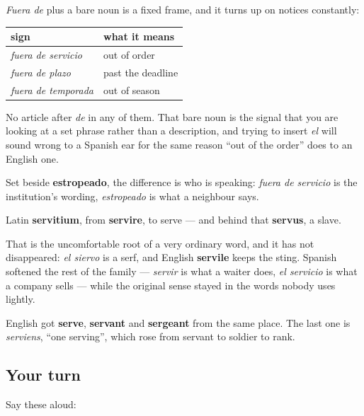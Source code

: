 \begin{grammarlens}[title={Grammar Lens: fuera de servicio, and its cousins}]
\emph{Fuera de} plus a bare noun is a fixed frame, and it turns up on notices constantly:

\noindent
\begin{tabularx}{\linewidth}{@{}>{\raggedright\arraybackslash}X>{\raggedright\arraybackslash}X@{}}
\toprule
\textbf{sign} & \textbf{what it means} \\
\midrule
\emph{fuera de servicio} & out of order \\
\emph{fuera de plazo} & past the deadline \\
\emph{fuera de temporada} & out of season \\
\bottomrule
\end{tabularx}

No article after \emph{de} in any of them. That bare noun is the signal that you are looking at a set phrase rather than a description, and trying to insert \emph{el} will sound wrong to a Spanish ear for the same reason \textquotedblleft{}out of the order\textquotedblright{} does to an English one.

Set beside \textbf{estropeado}, the difference is who is speaking: \emph{fuera de servicio} is the institution's wording, \emph{estropeado} is what a neighbour says.
\end{grammarlens}

\begin{cousinweb}
Latin \textbf{servitium}, from \textbf{servire}, to serve — and behind that \textbf{servus}, a slave.

That is the uncomfortable root of a very ordinary word, and it has not disappeared: \emph{el siervo} is a serf, and English \textbf{servile} keeps the sting. Spanish softened the rest of the family — \emph{servir} is what a waiter does, \emph{el servicio} is what a company sells — while the original sense stayed in the words nobody uses lightly.

English got \textbf{serve}, \textbf{servant} and \textbf{sergeant} from the same place. The last one is \emph{serviens}, \textquotedblleft{}one serving\textquotedblright{}, which rose from servant to soldier to rank.
\end{cousinweb}

\subsection*{Your turn}
Say these aloud:

